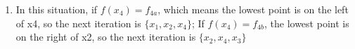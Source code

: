 
\begin {enumerate}
		\item In this situation, if $f(x_4)=f_{4a}$, which means the lowest point is on the left of x4, so the next iteration is $\{x_1,x_2,x_4\}$; If $f(x_4)=f_{4b}$, the lowest point is on the right of x2, so the next iteration is $\{x_2, x_4, x_3\}$
\end {enumerate}
